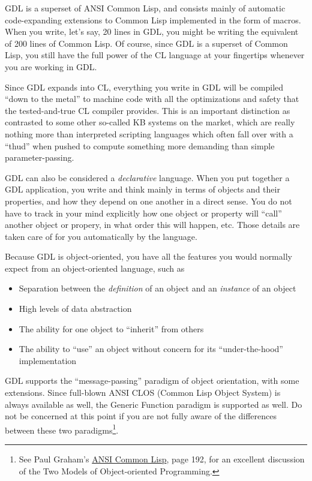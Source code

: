 \documentclass [11pt]{book}
\begin{document}
GDL is a superset of ANSI Common Lisp, and consists mainly of
automatic code-expanding extensions to Common Lisp implemented in the
form of macros. When you write, let's say, 20 lines in GDL, you might be
writing the equivalent of 200 lines of Common Lisp. Of course, since
GDL is a superset of Common Lisp, you still have the full power of the
CL language at your fingertips whenever you are working in GDL.

Since GDL expands into CL, everything you write in GDL will be
compiled ``down to the metal'' to machine code with all the
optimizations and safety that the tested-and-true CL compiler
provides. This is an important distinction as contrasted to some other 
so-called KB systems on the market, which are really nothing more than 
interpreted scripting languages which often fall over with a ``thud'' when 
pushed to compute something more demanding than simple parameter-passing.

GDL can also be considered a \emph{declarative} language. When you put together a GDL application, you write and think mainly
in terms of objects and their properties, and how they depend on one another in a direct
sense. You do not have to track in your mind explicitly how one object or property will ``call''
another object or propery, in what order this will happen, etc. Those details are
taken care of for you automatically by the language. 

Because GDL is object-oriented, you have all the features you would normally expect
from an object-oriented language, such as 

\begin{itemize}

\item Separation between the \emph{definition} of an object and an \emph{instance} of an object

\item High levels of data abstraction

\item The ability for one object to ``inherit'' from others

\item The ability to ``use'' an object without concern for its ``under-the-hood'' implementation

\end{itemize}

GDL supports the ``message-passing'' paradigm of object orientation, with some extensions. Since
full-blown ANSI CLOS (Common Lisp Object System) is always available as well, the Generic Function paradigm 
is supported as well. Do not be concerned at this point if you are not fully aware of the differences 
between these two paradigms\footnote{See Paul Graham's 
\underline{ANSI Common Lisp}, page 192, for an excellent discussion of the Two Models 
of Object-oriented Programming.}.
\end{document}
